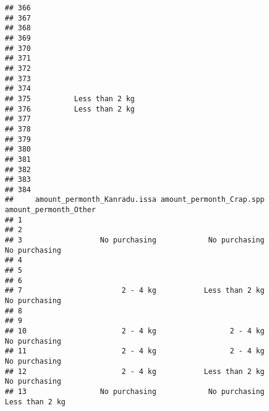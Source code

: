 \documentclass[
]{article}
\begin{document}
\begin{verbatim}
## 366                                                                       
## 367                                                                       
## 368                                                                       
## 369                                                                       
## 370                                                                       
## 371                                                                       
## 372                                                                       
## 373                                                                       
## 374                                                                       
## 375          Less than 2 kg                                               
## 376          Less than 2 kg                                               
## 377                                                                       
## 378                                                                       
## 379                                                                       
## 380                                                                       
## 381                                                                       
## 382                                                                       
## 383                                                                       
## 384                                                                       
##     amount_permonth_Kanradu.issa amount_permonth_Crap.spp amount_permonth_Other
## 1                                                                              
## 2                                                                              
## 3                  No purchasing            No purchasing         No purchasing
## 4                                                                              
## 5                                                                              
## 6                                                                              
## 7                       2 - 4 kg           Less than 2 kg         No purchasing
## 8                                                                              
## 9                                                                              
## 10                      2 - 4 kg                 2 - 4 kg         No purchasing
## 11                      2 - 4 kg                 2 - 4 kg         No purchasing
## 12                      2 - 4 kg           Less than 2 kg         No purchasing
## 13                 No purchasing            No purchasing        Less than 2 kg

\end{verbatim}
\end{document}
